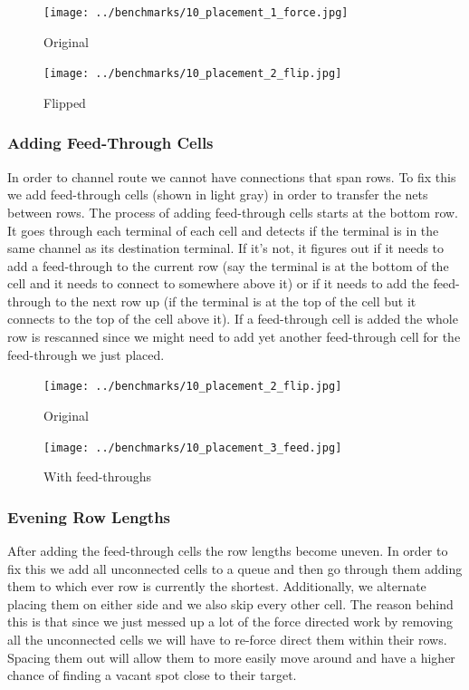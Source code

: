 \documentclass[10pt]{article}
\begin{document}
        \begin{figure}[H]
            \centering
            \texttt{[image: ../benchmarks/10\_placement\_1\_force.jpg]}
            \caption{Original}
        \end{figure}
        \begin{figure}[H]
            \centering
            \texttt{[image: ../benchmarks/10\_placement\_2\_flip.jpg]}
            \caption{Flipped}
        \end{figure}

        \subsubsection{Adding Feed-Through Cells}

        In order to channel route we cannot have connections that span rows. To
        fix this we add feed-through cells (shown in light gray) in order to
        transfer the nets between rows. The process of adding feed-through cells
        starts at the bottom row. It goes through each terminal of each cell
        and detects if the terminal is in the same channel as its destination
        terminal. If it's not, it figures out if it needs to add a feed-through
        to the current row (say the terminal is at the bottom of the cell and
        it needs to connect to somewhere above it) or if it needs to add the
        feed-through to the next row up (if the terminal is at the top of the
        cell but it connects to the top of the cell above it). If a feed-through
        cell is added the whole row is rescanned since we might need to
        add yet another feed-through cell for the feed-through we just placed.

        \begin{figure}[H]
            \centering
            \texttt{[image: ../benchmarks/10\_placement\_2\_flip.jpg]}
            \caption{Original}
        \end{figure}
        \begin{figure}[H]
            \centering
            \texttt{[image: ../benchmarks/10\_placement\_3\_feed.jpg]}
            \caption{With feed-throughs}
        \end{figure}

        \subsubsection{Evening Row Lengths}

        After adding the feed-through cells the row lengths become uneven. In
        order to fix this we add all unconnected cells to a queue and then go
        through them adding them to which ever row is currently the shortest.
        Additionally, we alternate placing them on either side and we also skip
        every other cell. The reason behind this is that since we just messed
        up a lot of the force directed work by removing all the unconnected
        cells we will have to re-force direct them within their rows. Spacing
        them out will allow them to more easily move around and have a higher
        chance of finding a vacant spot close to their target.
\end{document}
